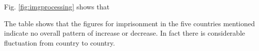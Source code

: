 



Fig. \ref{fig:imgprocessing} shows that 

The table shows that the figures for imprisonment in the five countries mentioned indicate no overall pattern of increase or decrease. In fact there is considerable fluctuation from country to country.